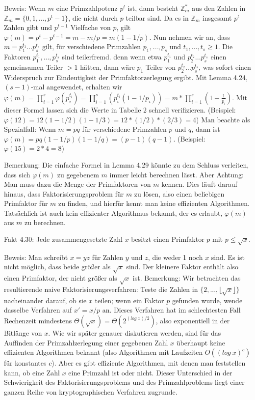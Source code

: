 \documentclass[a4paper]{article}
\begin{document}
\begin{multicols}{3}
        Beweis: Wenn $m$ eine Primzahlpotenz $p^t$ ist, dann besteht $\mathbb{Z}^*_m$ aus den Zahlen in $\mathbb{Z}_m=\{0,1,...,p^t-1\}$, die nicht durch $p$ teilbar sind. Da es in $\mathbb{Z}_m$ insgesamt $p^t$ Zahlen gibt und $p^{t-1}$ Vielfache von $p$, gilt $\varphi(m)=p^t-p^{t-1} =m-m/p=m(1-1/p)$. Nun nehmen wir an, dass $m=p^{t_1}_1 ...p^{t_s}_s$ gilt, für verschiedene Primzahlen $p_1,...,p_s$ und $t_1,...,t_s\geq 1$. Die Faktoren $p^{t_1}_1,...,p^{t_s}_s$ sind teilerfremd. denn wenn etwa $p^{t_1}_1$ und $p^{t_2}_2...p^{t_s}_s$ einen gemeinsamen Teiler $>1$ hätten, dann wäre $p_1$ Teiler von $p^{t_2}_2...p^{t_s}_s$, was sofort einen Widerspruch zur Eindeutigkeit der Primfaktorzerlegung ergibt. Mit Lemma 4.24, $(s-1)$-mal angewendet, erhalten wir $\varphi(m) =\prod^s_{i=1} \varphi(p^{t_i}_i) = \prod^s_{i=1} (p^{t_i}_i (1-1/p_i)) =m* \prod^s_{i=1} (1-\frac{1}{p_i})$.
        Mit dieser Formel lassen sich die Werte in Tabelle 2 schnell verifizieren. (Beispiel: $\varphi(12) = 12(1-1/2)(1-1/3) = 12*(1/2)*(2/3) = 4$) Man beachte als Spezialfall: Wenn $m=pq$ für verschiedene Primzahlen $p$ und $q$, dann ist $\varphi(m)=pq(1-1/p)(1-1/q) =(p-1)(q-1)$. (Beispiel: $\varphi(15) =2*4=8$)

        Bemerkung: Die einfache Formel in Lemma 4.29 könnte zu dem Schluss verleiten, dass sich $\varphi(m)$ zu gegebenem $m$ immer leicht berechnen lässt. Aber Achtung: Man muss dazu die Menge der Primfaktoren von $m$ kennen. Dies läuft darauf hinaus, dass Faktorisierungsproblem für $m$ zu lösen, also einen beliebigen Primfaktor für $m$ zu finden, und hierfür kennt man keine effizienten Algorithmen. Tatsächlich ist auch
        kein effizienter Algorithmus bekannt, der es erlaubt, $\varphi(m)$ aus $m$ zu berechnen.

        Fakt 4.30: Jede zusammengesetzte Zahl $x$ besitzt einen Primfaktor $p$ mit $p\leq\sqrt{x}$.

        Beweis: Man schreibt $x=yz$ für Zahlen $y$ und $z$, die weder 1 noch $x$ sind. Es ist nicht möglich, dass beide größer als $\sqrt{x}$ sind. Der kleinere Faktor enthält also einen Primfaktor, der nicht größer als $\sqrt{x}$ ist.
        Bemerkung: Wir betrachten das resultierende naive Faktorisierungsverfahren: Teste die Zahlen in $\{2,...,\lfloor\sqrt{x}\rfloor\}$ nacheinander darauf, ob sie $x$ teilen; wenn ein Faktor $p$ gefunden wurde, wende dasselbe Verfahren auf $x'=x/p$ an. Dieses Verfahren hat im schlechtesten Fall Rechenzeit mindestens $Θ(\sqrt{x}) = Θ(2^{(log\ x)/ 2})$, also exponentiell in der Bitlänge von $x$. Wie wir später genauer diskutieren werden, sind für das Auffinden der Primzahlzerlegung einer gegebenen Zahl $x$ überhaupt keine effizienten Algorithmen bekannt (also Algorithmen mit Laufzeiten $O((log\ x)^c)$ für konstantes $c$). Aber es gibt effiziente Algorithmen, mit denen man feststellen kann, ob eine Zahl $x$ eine Primzahl ist oder nicht. Dieser Unterschied in der Schwierigkeit des Faktorisierungsproblems und des Primzahlproblems liegt einer ganzen Reihe von kryptographischen Verfahren zugrunde.


\end{multicols}
\end{document}
